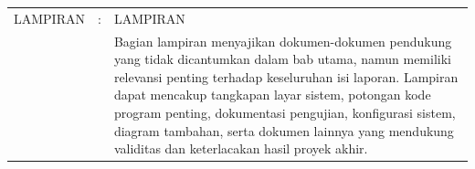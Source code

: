 \begin{longtable}{@{}llp{11cm}@{}}
    LAMPIRAN       & : & LAMPIRAN                                                                                                                                                                                                                                                                                                                                                                                                                                                                                                                                                                                                                                                                                                                                                                                       \\
                   &   & Bagian lampiran menyajikan dokumen-dokumen pendukung yang tidak dicantumkan dalam bab utama, namun memiliki relevansi penting terhadap keseluruhan isi laporan. Lampiran dapat mencakup tangkapan layar sistem, potongan kode program penting, dokumentasi pengujian, konfigurasi sistem, diagram tambahan, serta dokumen lainnya yang mendukung validitas dan keterlacakan hasil proyek akhir.                                                                                                                                                                                                                                                                                                                                                                                                \\
\end{longtable}
